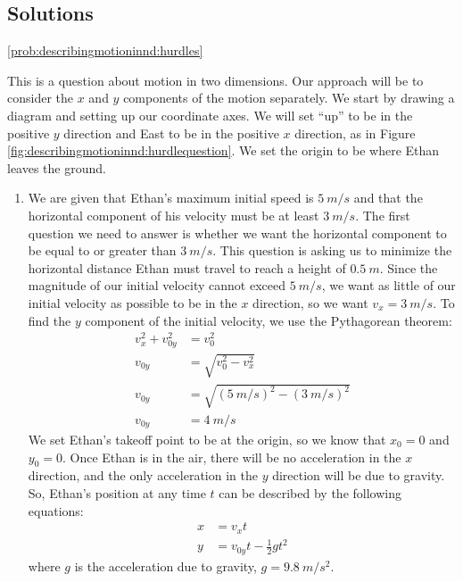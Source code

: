 \subsection{Solutions}
\begin{solution}{\ref{prob:describingmotioninnd:hurdles}}{This is a question about motion in two dimensions. Our approach will be to consider the $x$ and $y$ components of the motion separately. We start by drawing a diagram and setting up our coordinate axes. We will set ``up'' to be in the positive $y$ direction and East to be in the positive $x$ direction, as in Figure \ref{fig:describingmotioninnd:hurdlequestion}. We set the origin to be where Ethan leaves the ground.


\begin{enumerate}[label=\alph*)]
\item We are given that Ethan's maximum initial speed is $\SI{5}{m/s}$ and that the horizontal component of his velocity must be at least $\SI{3}{m/s}$. The first question we need to answer is whether we want the horizontal component to be equal to or greater than $\SI{3}{m/s}$. This question is asking us to minimize the horizontal distance Ethan must travel to reach a height of $\SI{0.5}{m}$. Since the magnitude of our initial velocity cannot exceed $\SI{5}{m/s}$, we want as little of our initial velocity as possible to be in the $x$ direction, so we want $v_x=\SI{3}{m/s}$. To find the $y$ component of the initial velocity, we use the Pythagorean theorem: 
\begin{align*}
v_x^2+v_{0y}^2&=v_0^2\\
v_{0y}&=\sqrt{v_0^2-v_x^2}\\
v_{0y}&=\sqrt{(\SI{5}{m/s})^2-(\SI{3}{m/s})^2}\\
v_{0y}&=\SI{4}{m/s}
\end{align*}
We set Ethan's takeoff point to be at the origin, so we know that $x_0=0$ and $y_0=0$. Once Ethan is in the air, there will be no acceleration in the $x$ direction, and the only acceleration in the $y$ direction will be due to gravity.
So, Ethan's position at any time $t$ can be described by the following equations: 
\begin{align*}
x&=v_{x}t\\
y&=v_{0y}t-\frac{1}{2}gt^2
\end{align*}
where $g$ is the acceleration due to gravity, $g=\SI{9.8}{m/s^2}$.\\


\end{enumerate}}
\end{solution}

